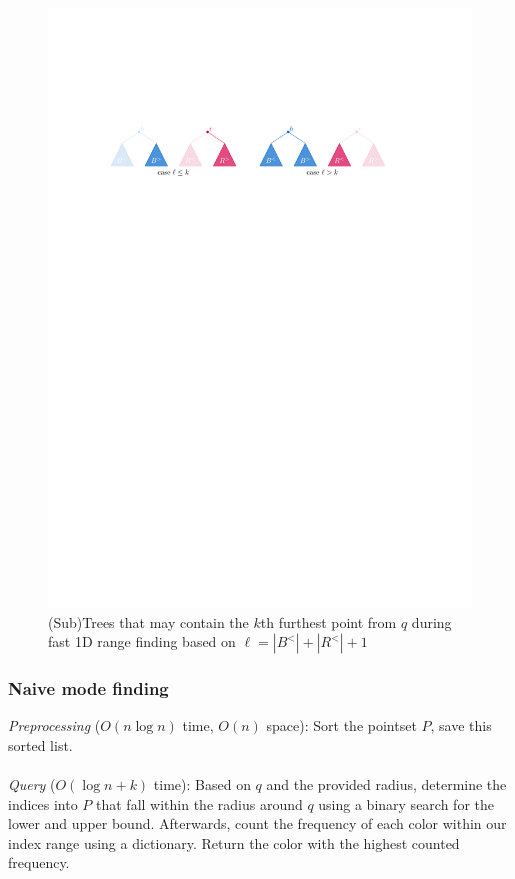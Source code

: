 \documentclass{article}
\newcommand{\fb}[1]{{#1}}
\begin{document}
\begin{figure}%
    \centering
    \includegraphics[width=12cm]{figs/opt_rank.pdf}
    \caption{\fb{(Sub)Trees that may contain the $k$th furthest point from $q$ during fast 1D range finding based on $\ell = |B^<| + |R^<| + 1$}}%
    \label{fig:vanderHorst_treesplit}%
\end{figure}
\subsubsection{Naive mode finding}
\textit{Preprocessing} ($O(n \log n)$ time, $O(n)$ space): \fb{Sort the pointset $P$, save this sorted list.} \\\\
\textit{Query} ($O(\log n + k)$ time): \fb{Based on $q$ and the provided radius, determine the indices into $P$ that fall within the radius around $q$ using a binary search for the lower and upper bound. Afterwards, count the frequency of each color within our index range using a dictionary. Return the color with the highest counted frequency.}
\end{document}
